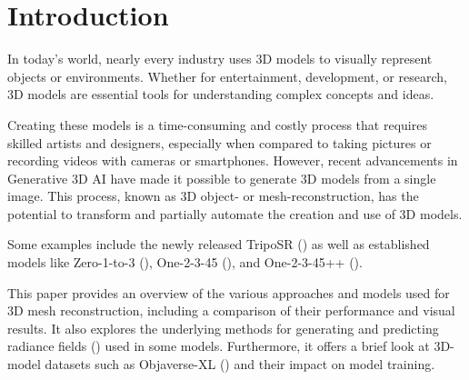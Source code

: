 

\section{Introduction}
\label{section:Introduction}
In today's world, nearly every industry uses 3D models to visually represent objects or environments. Whether for entertainment, development, or research, 3D models are essential tools for understanding complex concepts and ideas.

Creating these models is a time-consuming and costly process that requires skilled artists and designers, especially when compared to taking pictures or recording videos with cameras or smartphones. However, recent advancements in Generative 3D AI have made it possible to generate 3D models from a single image. This process, known as 3D object- or mesh-reconstruction, has the potential to transform and partially automate the creation and use of 3D models.

Some examples include the newly released TripoSR (\textcite{tochilkin_triposr_2024}) as well as established models like Zero-1-to-3 (\textcite{liu_zero-1--3_2023}), One-2-3-45 (\textcite{liu_one-2-3-45_2023}), and One-2-3-45++ (\textcite{liu_one-2-3-45_2023-1}).

This paper provides an overview of the various approaches and models used for 3D mesh reconstruction, including a comparison of their performance and visual results. It also explores the underlying methods for generating and predicting radiance fields (\textcite{mildenhall_nerf_2021}) used in some models. Furthermore, it offers a brief look at 3D-model datasets such as Objaverse-XL (\textcite{deitke_objaverse-xl_2023}) and their impact on model training.


